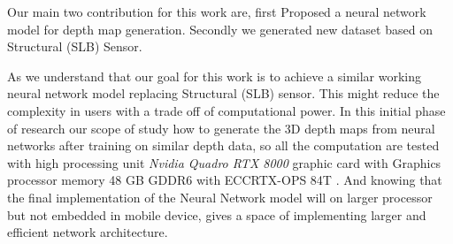 Our main two contribution for this work are, first Proposed a neural network model for depth map generation. Secondly we generated new dataset based on Structural (SLB) Sensor.


As we understand that our goal for this work is to achieve a similar working neural network model replacing Structural (SLB) sensor. This might reduce the complexity in users with a trade off of computational power. In this initial phase of research our scope of study how to generate the 3D depth maps from neural networks after training on similar depth data, so all the computation are tested with high processing unit \textit{Nvidia Quadro RTX 8000} graphic card with Graphics processor memory 48 GB GDDR6 with ECCRTX-OPS 84T . 
And knowing that the final implementation of the Neural Network model will on larger processor but not embedded in mobile device, gives a space of implementing larger and efficient network architecture. 
